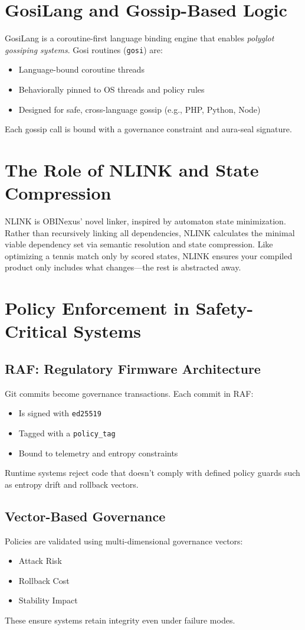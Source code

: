 \documentclass{article}
\begin{document}
\section{GosiLang and Gossip-Based Logic}
GosiLang is a coroutine-first language binding engine that enables \textit{polyglot gossiping systems}. Gosi routines (\texttt{gosi}) are:
\begin{itemize}
    \item Language-bound coroutine threads
    \item Behaviorally pinned to OS threads and policy rules
    \item Designed for safe, cross-language gossip (e.g., PHP, Python, Node)
\end{itemize}
Each gossip call is bound with a governance constraint and aura-seal signature.

\section{The Role of NLINK and State Compression}
NLINK is OBINexus' novel linker, inspired by automaton state minimization. Rather than recursively linking all dependencies, NLINK calculates the minimal viable dependency set via semantic resolution and state compression. Like optimizing a tennis match only by scored states, NLINK ensures your compiled product only includes what changes—the rest is abstracted away.

\section{Policy Enforcement in Safety-Critical Systems}
\subsection{RAF: Regulatory Firmware Architecture}
Git commits become governance transactions. Each commit in RAF:
\begin{itemize}
    \item Is signed with \texttt{ed25519}
    \item Tagged with a \texttt{policy\_tag}
    \item Bound to telemetry and entropy constraints
\end{itemize}
Runtime systems reject code that doesn't comply with defined policy guards such as entropy drift and rollback vectors.

\subsection{Vector-Based Governance}
Policies are validated using multi-dimensional governance vectors:
\begin{itemize}
    \item Attack Risk
    \item Rollback Cost
    \item Stability Impact
\end{itemize}
These ensure systems retain integrity even under failure modes.
\end{document}
